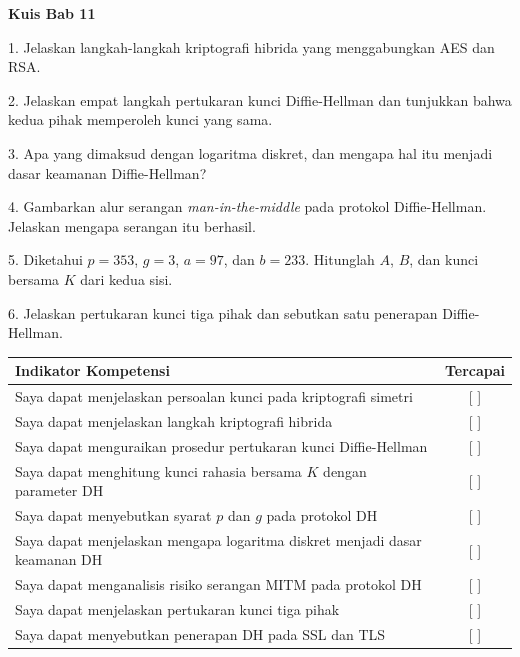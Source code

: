 
\begin{obeassessment}
\textbf{Kuis Bab 11}

1. Jelaskan langkah-langkah kriptografi hibrida yang menggabungkan AES dan RSA.

2. Jelaskan empat langkah pertukaran kunci Diffie-Hellman dan tunjukkan bahwa
   kedua pihak memperoleh kunci yang sama.

3. Apa yang dimaksud dengan logaritma diskret, dan mengapa hal itu menjadi
   dasar keamanan Diffie-Hellman?

4. Gambarkan alur serangan \textit{man-in-the-middle} pada protokol
   Diffie-Hellman. Jelaskan mengapa serangan itu berhasil.

5. Diketahui $p = 353$, $g = 3$, $a = 97$, dan $b = 233$. Hitunglah $A$, $B$,
   dan kunci bersama $K$ dari kedua sisi.

6. Jelaskan pertukaran kunci tiga pihak dan sebutkan satu penerapan
   Diffie-Hellman.
\end{obeassessment}
\begin{competencychecklist}
\begin{tabularx}{\linewidth}{|X|c|}
\hline
Indikator Kompetensi & Tercapai \\
\hline
Saya dapat menjelaskan persoalan kunci pada kriptografi simetri & [ ] \\
\hline
Saya dapat menjelaskan langkah kriptografi hibrida & [ ] \\
\hline
Saya dapat menguraikan prosedur pertukaran kunci Diffie-Hellman & [ ] \\
\hline
Saya dapat menghitung kunci rahasia bersama $K$ dengan parameter DH & [ ] \\
\hline
Saya dapat menyebutkan syarat $p$ dan $g$ pada protokol DH & [ ] \\
\hline
Saya dapat menjelaskan mengapa logaritma diskret menjadi dasar keamanan DH & [ ] \\
\hline
Saya dapat menganalisis risiko serangan MITM pada protokol DH & [ ] \\
\hline
Saya dapat menjelaskan pertukaran kunci tiga pihak & [ ] \\
\hline
Saya dapat menyebutkan penerapan DH pada SSL dan TLS & [ ] \\
\hline
\end{tabularx}
\end{competencychecklist}
